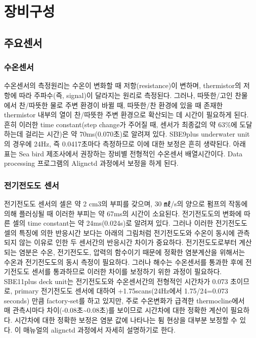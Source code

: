 \documentclass[
]{book}
\begin{document}
\hypertarget{uxc7a5uxbe44uxad6cuxc131}{%
\section{장비구성}\label{uxc7a5uxbe44uxad6cuxc131}}

\hypertarget{uxc8fcuxc694uxc13cuxc11c}{%
\subsection{주요센서}\label{uxc8fcuxc694uxc13cuxc11c}}

\hypertarget{uxc218uxc628uxc13cuxc11c}{%
\subsubsection{수온센서}\label{uxc218uxc628uxc13cuxc11c}}

수온센서의 측정원리는 수온이 변화할 때 저항(resistance)이 변하며, thermistor의 저항에 따라 주파수(즉, signal)이 달라지는 원리로 측정된다. 그러나, 따뜻한/고인 찬물에서 찬/따뜻한 물로 주변 환경이 바뀔 때, 따뜻한/찬 환경에 있을 때 존재한 thermistor 내부의 열이 찬/따뜻한 주변 환경으로 확산되는 데 시간이 필요하게 된다. 흔히 이러한 time constant(step change가 주어질 때, 센서가 최종값의 약 63\%에 도달하는데 걸리는 시간)은 약 70ms(0.070초)로 알려져 있다. SBE9plus underwater unit의 경우에 24Hz, 즉 0.0417초마다 측정하므로 이에 대한 보정은 흔히 생략된다. 아래 표는 Sea bird 제조사에서 권장하는 장비별 전형적인 수온센서 배열시간이다. Data processing 프로그램의 Alignctd 과정에서 보정을 하게 된다.

\hypertarget{uxc804uxae30uxc804uxb3c4uxb3c4-uxc13cuxc11c}{%
\subsubsection{전기전도도 센서}\label{uxc804uxae30uxc804uxb3c4uxb3c4-uxc13cuxc11c}}

전기전도도 센서의 셀은 약 2 cm3의 부피를 갖으며, 30 ㎖/s의 양으로 펌프의 작동에 의해 플러싱될 때 이러한 부피는 약 67ms의 시간이 소요된다. 전기전도도의 변화에 따른 셀의 time constant는 약 24ms(0.024s)로 알려져 있다. 그러나 이러한 전기전도도 셀의 특징에 의한 반응시간 보다는 아래의 그림처럼 전기전도도와 수온이 동시에 관측되지 않는 이유로 인한 두 센서간의 반응시간 차이가 중요하다. 전기전도도로부터 계산되는 염분은 수온, 전기전도도, 압력의 함수이기 때문에 정확한 염분계산을 위해서는 수온과 전기전도도의 동시 측정이 필요하다. 그러나 해수는 수온센서를 통과한 후에 전기전도도 센서를 통과하므로 이러한 차이를 보정하기 위한 과정이 필요하다. SBE11plus deck unit는 전기전도도와 수온센서간의 전형적인 시간차가 0.073 초이므로, primary 전기전도도 센서에 대하여 +1.75scans(24Hz에서 1.75/24=0.073 seconds) 만큼 factory-set를 하고 있지만, 주로 수온변화가 급격한 thermocline에서 매 관측시마다 차이(-0.08초\textasciitilde0.08초)를 보이므로 시간차에 대한 정확한 계산이 필요하다. 시간차에 대한 정확한 보정은 염분 값에 나타나는 튐 현상을 대부분 보정할 수 있다. 이 매뉴얼의 alignctd 과정에서 자세히 설명하기로 한다.
\end{document}
